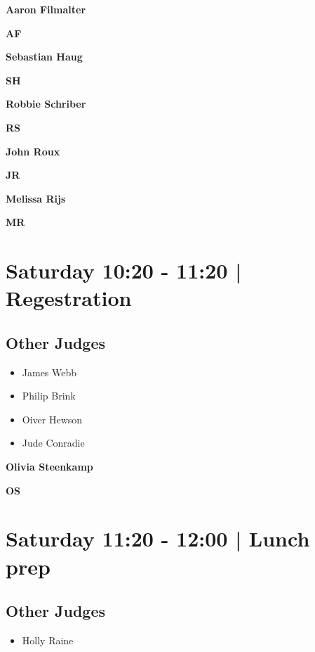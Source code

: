 \documentclass[10pt, A5]{article}
\newcommand{\newtitle}[1]{\begin{center}{\Huge\bfseries #1 }\\ \vspace{5mm}\end{center}}
\newcommand{\newsubtitle}[1]{\begin{center}{\color{grey}\Large\bfseries #1 }\\ \vspace{5mm}\end{center}}
\begin{document}
    
	\clearpage

		\newtitle{Aaron Filmalter}
	\newsubtitle{AF}

    
	\clearpage

		\newtitle{Sebastian Haug}
	\newsubtitle{SH}

    
	\clearpage

		\newtitle{Robbie Schriber}
	\newsubtitle{RS}

    
	\clearpage

		\newtitle{John Roux}
	\newsubtitle{JR}

    
	\clearpage

		\newtitle{Melissa Rijs}
	\newsubtitle{MR}

            \section*{Saturday 10:20
        -
        11:20
        |
         Regestration}
        
                
        \subsection*{Other Judges}
        
            \begin{itemize}
                            \item James Webb
                            \item Philip Brink
                            \item Oiver Hewson
                            \item Jude Conradie
                        \end{itemize}
        

    
	\clearpage

		\newtitle{Olivia Steenkamp}
	\newsubtitle{OS}

            \section*{Saturday 11:20
        -
        12:00
        |
         Lunch prep}
        
                
        \subsection*{Other Judges}
        
            \begin{itemize}
                            \item Holly Raine
                        \end{itemize}
        
\end{document}
